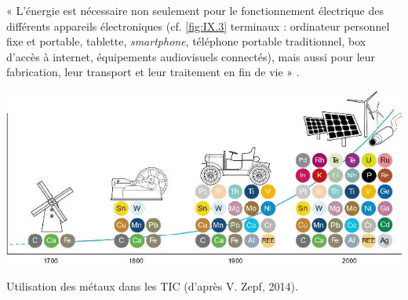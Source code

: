 


« L’énergie est nécessaire non seulement pour le fonctionnement électrique des différents appareils électroniques (cf. \cref{fig:IX.3} terminaux : ordinateur personnel fixe et portable, tablette, \textit{smartphone}, téléphone portable traditionnel, box d’accès à internet, équipements audiovisuels connectés), mais aussi pour leur fabrication, leur transport et leur traitement en fin de vie »  \parencite{Marquet-et-al:2019}.


\begin{jazzfigure}
\includegraphics[width=\linewidth]{./Images/Chapter09/figIX-06-metals-tic-zepf-2014.jpg}
\caption{\label{fig:IX.6}Utilisation des métaux dans les TIC (d'après V. Zepf, 2014).}
\end{jazzfigure}


